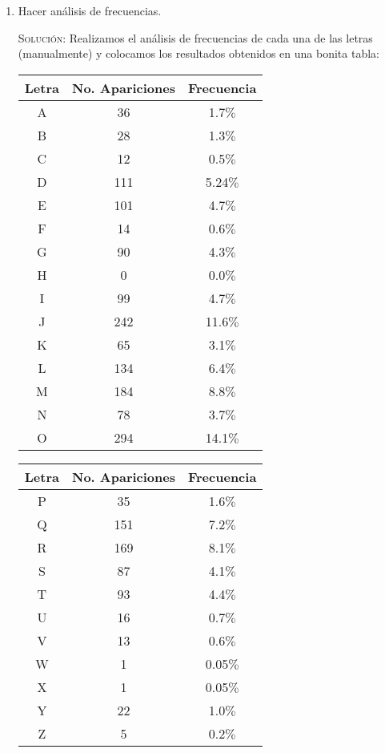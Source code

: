 \documentclass[letterpaper,11pt]{article}
\begin{document}
\begin{enumerate}
    \begin{enumerate}
        \item Hacer análisis de frecuencias.
        
        \textsc{Solución:}
        Realizamos el análisis de frecuencias de cada una de las letras 
        (manualmente) y colocamos los resultados obtenidos en una bonita tabla:

        \begin{center}
        \begin{tabular}{|c|c|c|}
        \hline
        Letra & No. Apariciones & Frecuencia \\
        \hline 
        A & 36 & 1.7$\%$ \\ \hline
        B & 28 & 1.3$\%$ \\ \hline
        C & 12 & 0.5$\%$ \\ \hline
        D & 111 & 5.24$\%$ \\ \hline
        E & 101 & 4.7$\%$ \\ \hline 
        F & 14 & 0.6$\%$ \\ \hline 
        G & 90 & 4.3$\%$ \\ \hline 
        H & 0 & 0.0$\%$ \\ \hline 
        I & 99 & 4.7$\%$ \\ \hline 
        J & 242 &11.6$\%$ \\ \hline 
        K & 65 & 3.1$\%$ \\ \hline 
        L & 134 & 6.4$\%$ \\ \hline 
        M & 184 & 8.8$\%$ \\ \hline
        N & 78 & 3.7$\%$ \\ \hline 
        O & 294 & 14.1$\%$ \\ \hline
        \end{tabular}
        \end{center}

        \begin{center}
        \begin{tabular}{|c|c|c|}
        \hline
        Letra & No. Apariciones & Frecuencia \\
        \hline
        P & 35 &1.6$\%$ \\ \hline 
        Q & 151 & 7.2$\%$ \\ \hline 
        R & 169 & 8.1$\%$ \\ \hline 
        S & 87 & 4.1$\%$ \\ \hline 
        T & 93 & 4.4$\%$ \\ \hline 
        U & 16 & 0.7$\%$ \\ \hline 
        V & 13 & 0.6$\%$ \\ \hline 
        W & 1 & 0.05$\%$ \\ \hline 
        X & 1 & 0.05$\%$ \\ \hline 
        Y & 22 & 1.0$\%$ \\ \hline 
        Z & 5 & 0.2$\%$ \\ \hline 
        \end{tabular}
        \end{center}
        

\end{enumerate}
\end{enumerate}
\end{document}
